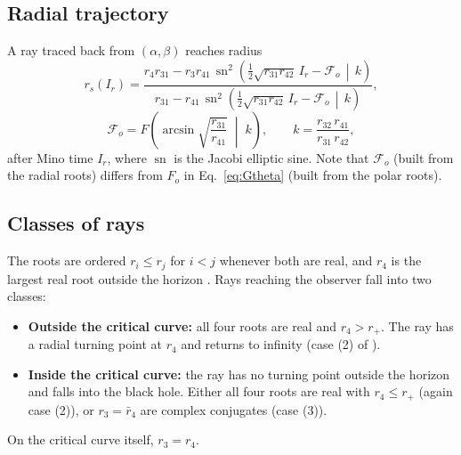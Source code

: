 \documentclass[11pt]{article}
\begin{document}
\subsection{Radial trajectory}

A ray traced back from $(\alpha,\beta)$ reaches radius
\cite{GL2020lensing,GLM2020}
\begin{equation}
r_s(I_r) = \frac{r_4 r_{31} - r_3 r_{41}\,\operatorname{sn}^2\!\left(\tfrac12\sqrt{r_{31}r_{42}}\,I_r - \mathcal{F}_o \,\middle|\, k\right)}
                 {r_{31} - r_{41}\,\operatorname{sn}^2\!\left(\tfrac12\sqrt{r_{31}r_{42}}\,I_r - \mathcal{F}_o \,\middle|\, k\right)},
\label{eq:rs}
\end{equation}
\begin{equation}
\mathcal{F}_o = F\!\left(\arcsin\sqrt{\frac{r_{31}}{r_{41}}}\;\middle|\;k\right),
\qquad
k = \frac{r_{32}\,r_{41}}{r_{31}\,r_{42}},
\end{equation}
after Mino time $I_r$, where $\operatorname{sn}$ is the Jacobi elliptic sine.
Note that $\mathcal{F}_o$ (built from the radial roots) differs from $F_o$ in
Eq.~\eqref{eq:Gtheta} (built from the polar roots).

\subsection{Classes of rays}

The roots are ordered $r_i \le r_j$ for $i < j$ whenever both are real, and
$r_4$ is the largest real root outside the horizon \cite{GL2020lensing}.
Rays reaching the observer fall into two classes:
\begin{itemize}
  \item \textbf{Outside the critical curve:} all four roots are real and
        $r_4 > r_+$. The ray has a radial turning point at $r_4$ and returns
        to infinity (case (2) of \cite{GL2020null}).
  \item \textbf{Inside the critical curve:} the ray has no turning point
        outside the horizon and falls into the black hole. Either all four
        roots are real with $r_4 \le r_+$ (again case (2)), or $r_3 = \bar r_4$
        are complex conjugates (case (3)).
\end{itemize}
On the critical curve itself, $r_3 = r_4$.
\end{document}
